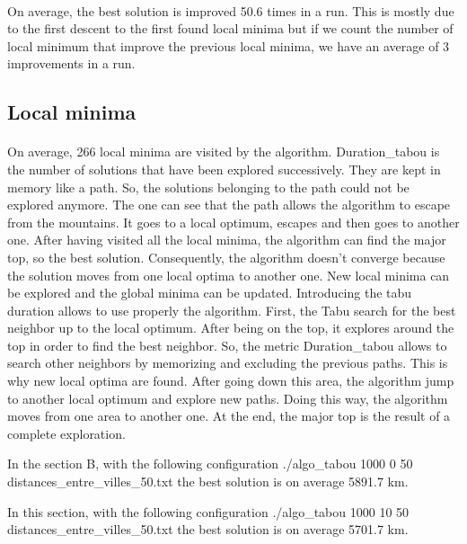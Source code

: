 \documentclass[12pt,oneside,a4paper]{article}
\begin{document}
\paragraph{}
    On average, the best solution is improved 50.6 times in a run. This is mostly due to the first
    descent to the first found local minima but if we count the number of local minimum that improve
    the previous local minima, we have an average of 3 improvements in a run.

\subsection{Local minima}
\paragraph{}
    On average, 266 local minima are visited by the algorithm. 
    Duration\_tabou is the number of solutions that have been explored successively. They are kept in memory like a path. So, the solutions belonging to the path could
    not be explored anymore. The one can see that the path allows the algorithm to escape from the mountains. It goes to a local optimum, escapes and then goes to another one. 
    After having visited all the local minima, the algorithm can find the major top, so the best solution. Consequently, the algorithm doesn’t converge because the solution 
    moves from one local optima to another one. New local minima can be explored and the global minima can be updated. Introducing the tabu duration allows to use properly
    the algorithm. First, the Tabu search for the best neighbor up to the local optimum. 
    After being on the top, it explores around the top in order to find the best neighbor. So, the metric Duration\_tabou allows to search other neighbors by memorizing and 
    excluding the previous paths.  This is why new local optima are found.
    After going down this area, the algorithm jump to another local optimum and explore new paths.
    Doing this way, the algorithm moves from one area to another one. At the end, the major top is the result of a complete exploration. 

    In the section B, with the following configuration ./algo\_tabou  1000 0 50 distances\_entre\_villes\_50.txt the best solution is on average  5891.7 km.

    In this section, with the following configuration ./algo\_tabou  1000 10 50 distances\_entre\_villes\_50.txt
    the best solution is on average 5701.7 km.
\end{document}
